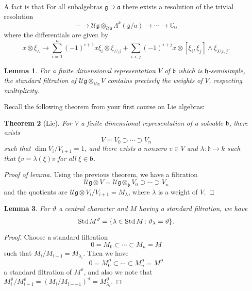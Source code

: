 \documentclass[leqno, openany]{memoir}
\newtheorem{thm}{Theorem}[section]
\newtheorem{lem}[thm]{Lemma}
\theoremstyle{definition}
\theoremstyle{remark}
\theoremstyle{plain}
\theoremstyle{definition}
\theoremstyle{remark}
\newcommand{\C}{\mathbb{C}}
\newcommand{\U}{\mathcal{U}}
\newcommand{\g}{\mathfrak{g}}
\newcommand{\h}{\mathfrak{h}}
\renewcommand{\b}{\mathfrak{b}}
\newcommand{\mf}[1]{\mathfrak{#1}}
\newcommand{\on}[1]{\operatorname{#1}}
\begin{document}
A fact is that For all subalgebras $\g \supseteq \mf{a}$ there exists a resolution of the trivial resolution
\[ \cdots \to \U \g \otimes_{\U \mf{a}} \Lambda^k (\mf{g}/a) \to \cdots \to \C_0 \]
where the differentials are given by
\[ x \otimes \xi_{\wedge} \mapsto \sum_{i=1}^n (-1)^{i+1} x \xi_i \otimes \xi_{\wedge \setminus i} + \sum_{i < j} (-1)^{i+j} x \otimes [\xi_i, \xi_j] \wedge \xi_{\lambda \setminus i,j}. \]

\begin{lem}
    For a finite dimensional representation $V$ of $\mf{b}$ which is $\h$-semisimple, the standard filtration of $\U \g \otimes_{\U \mf{a}} V$ contains precisely the weights of $V$, respecting multiplicity.
\end{lem}

Recall the following theorem from your first course on Lie algebras:
\begin{thm}[Lie]
    For $V$ a finite dimensional representation of a solvable $\mf{b}$, there exists
    \[ V = V_0 \supset \cdots \supset V_n \]
    such that $\dim V_i / V_{i+1} = 1$, and there exists a nonzero $v \in V$ and $\lambda \colon \mf{b} \to k$ such that $\xi v = \lambda(\xi) v$ for all $\xi \in \mf{b}$.
\end{thm}

\begin{proof}[Proof of lemma]
    Using the previous theorem, we have a filtration
    \[ \U \g \otimes V = \U \g \otimes_{\b} V_0 \supset \cdots \supset V_n \]
    and the quotients are $\U \g \otimes V_i / V_{i+1} = M_{\lambda}$, where $\lambda$ is a weight of $V$.
\end{proof}

\begin{lem}
    For $\vartheta$ a central character and $M$ having a standard filtration, we have
    \[ \on{Std} M^{\vartheta} = \qty{\lambda \in \on{Std} M \colon \vartheta_{\lambda} = \vartheta}. \]
\end{lem}

\begin{proof}
    Choose a standard filtration
    \[ 0 = M_0 \subset \cdots \subset M_n = M \]
    such that $M_i / M_{i-1} = M_{\lambda_i}$. Then we have
    \[ 0 = M_0^{\vartheta} \subset \cdots \subset M_n^{\vartheta} = M^{\vartheta} \]
    a standard filtration of $M^{\vartheta}$, and also we note that $M_i^{\vartheta} / M_{i-1}^{\vartheta} = (M_i / M_{i--1})^{\vartheta} = M_{\lambda_i}^{\vartheta}$.
\end{proof}
\end{document}
